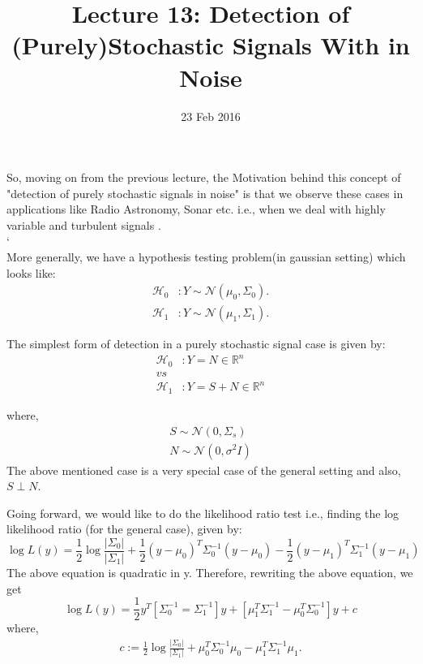 \documentclass[a4paper,english,12pt]{article}
\title{Lecture 13: Detection of (Purely)Stochastic Signals With in Noise}
\date{23 Feb 2016}
\author{}
\begin{document}
\maketitle
So, moving on from the previous lecture, the Motivation behind this concept of "detection of purely stochastic signals in noise" is that we observe these cases in applications like Radio Astronomy, Sonar etc. i.e., when we deal with highly variable and turbulent signals  .\\

`\\ More generally, we have a hypothesis testing problem(in gaussian setting) which looks like:
\begin{align*}
\label{n1}
\mathcal{H}_0 &: Y \sim \mathcal{N}(\mu_0,\Sigma_0).\\
\mathcal{H}_1 &: Y \sim \mathcal{N}(\mu_1,\Sigma_1).
\end{align*}

The simplest form of detection in a purely stochastic signal case is given by:
\begin{align*}
\mathcal{H}_0 &: Y = N \in \mathbb{R}^n\\
vs\\
\mathcal{H}_1 &: Y = S+N \in \mathbb{R}^n 
\end{align*}

where,  
\begin{align*}  
S\sim \mathcal{N}(0,\Sigma_s)\\
N\sim \mathcal{N}(0,\sigma^2I)
\end{align*}
The above mentioned case is a very special case of the general setting and also, $S\perp N$.

Going forward, we would like to do the likelihood ratio test i.e., finding the log likelihood ratio (for the general case), given by:
\begin{equation*}
\log L(y)= \frac{1}{2}\log\frac{|\Sigma_0|}{|\Sigma_1|}+\frac{1}{2}(y-\mu_0)^T\Sigma_0^{-1}(y-\mu_0)-\frac{1}{2}(y-\mu_1)^T\Sigma_1^{-1}(y-\mu_1)
\end{equation*}
The above equation is quadratic in y.
Therefore, rewriting the above equation, we get
\begin{equation*}
\log L(y)=\frac{1}{2}y^T[\Sigma_0^{-1}=\Sigma_1^{-1}]y+[\mu_1^T\Sigma_1^{-1}-\mu_0^T\Sigma_0^{-1}]y+c
\end{equation*}
where,
\begin{align*}
c:=\frac{1}{2}\log\frac{|\Sigma_0|}{|\Sigma_1|}+\mu_0^T\Sigma_0^{-1}\mu_0-\mu_1^T\Sigma_1^{-1}\mu_1.
\end{align*}
\end{document}
